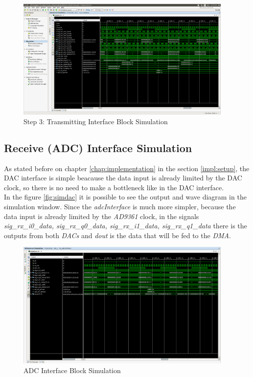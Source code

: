 \begin{figure}[htbp]
    \centering
    \includegraphics[width=0.95\textwidth]{./figures/txInterface}
    \caption{ Step 3: Transmitting Interface Block Simulation
    \label{fig:simtxif}}
\end{figure}

\subsection{Receive (ADC) Interface Simulation}

As stated before on chapter \ref{chap:implementation} in the section \ref{impl:setup},
the DAC interface is simple beacause the data input is already limited by the DAC
clock, so there is no need to make a bottleneck like in the DAC interface.\\

 In the figure \ref{fig:simdac} it is possible to see the output and wave
diagram in the simulation window. Since the \textit{adcInterface} is much more
simpler, because the data input is already limited by the \textit{AD9361}
clock, in the signals \textit{sig\_rx\_i0\_data, sig\_rx\_q0\_data,
sig\_rx\_i1\_data, sig\_rx\_q1\_data} there is the outputs from both
\textit{DACs} and \textit{dout} is the data that will be fed to the
\textit{DMA}.\\

\begin{figure}[htbp]
    \centering
    \includegraphics[width=0.95\textwidth]{./figures/adcInterface}
    \caption{ ADC Interface Block Simulation
    \label{fig:simadc}}
\end{figure}

